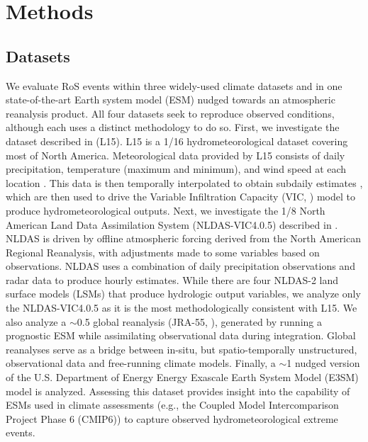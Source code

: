 \documentclass[nhess, manuscript]{copernicus}
\begin{document}

\section{Methods}

\subsection{Datasets}

We evaluate RoS events within three widely-used climate datasets and in one state-of-the-art Earth system model (ESM) nudged towards an atmospheric reanalysis product. 
All four datasets seek to reproduce observed conditions, although each uses a distinct methodology to do so. 
First, we investigate the dataset described in \citet{livneh2015spatially} (L15). 
L15 is a 1/16\degree{} hydrometeorological dataset covering most of North America. 
Meteorological data provided by L15 consists of daily precipitation, temperature (maximum and minimum), and wind speed at each location \citep{henn2018an}. 
This data is then temporally interpolated to obtain subdaily estimates \citep{bohn2013global}, which are then used to drive the Variable Infiltration Capacity (VIC, \citet{liang1994simple}) model to produce hydrometeorological outputs. 
Next, we investigate the 1/8\degree{} North American Land Data Assimilation System (NLDAS-VIC4.0.5)  described in \citet{xia2012continental1}. 
NLDAS is driven by offline atmospheric forcing derived from the North American Regional Reanalysis, with adjustments made to some variables based on observations. 
NLDAS uses a combination of daily precipitation observations and radar data to produce hourly estimates. 
While there are four NLDAS-2 land surface models (LSMs) that produce hydrologic output variables, we analyze only the NLDAS-VIC4.0.5 as it is the most methodologically consistent with L15.
We also analyze a $\sim$0.5\degree{} global reanalysis (JRA-55, \citet{kobayashi2015jra55}), generated by running a prognostic ESM while assimilating observational data during integration. 
Global reanalyses serve as a bridge between in-situ, but spatio-temporally unstructured, observational data and free-running climate models. 
Finally, a $\sim$1\degree{} nudged version of the U.S. Department of Energy Energy Exascale Earth System Model (E3SM) model is analyzed. Assessing this dataset provides insight into the capability of ESMs used in climate assessments (e.g., the Coupled Model Intercomparison Project Phase 6 (CMIP6)) to capture observed hydrometeorological extreme events.
\end{document}
